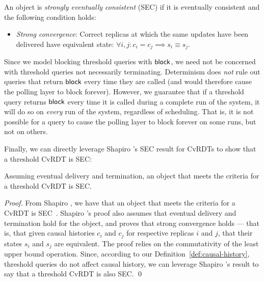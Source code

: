 \begin{definition}
  \label{def:strong-eventual-consistency}
  An object is \emph{strongly eventually consistent} (SEC) if it is
  eventually consistent and the following condition holds:
  \begin{itemize}
  \item \emph{Strong convergence}: Correct replicas at which the same
    updates have been delivered have equivalent state:
    $\forall i, j : c_i = c_j \implies s_i \equiv s_j$.
  \end{itemize}
\end{definition}
Since we model blocking threshold queries with $\textsf{block}$, we need not
be concerned with threshold queries not necessarily terminating.
Determinism does \emph{not} rule out queries that return $\textsf{block}$
every time they are called (and would therefore cause the polling
layer to block forever).  However, we guarantee that if a threshold
query returns $\textsf{block}$ every time it is called during a complete run
of the system, it will do so on \emph{every} run of the system,
regardless of scheduling.  That is, it is not possible for a query to
cause the polling layer to block forever on some runs, but not on
others.

Finally, we can directly leverage Shapiro 
\etal's SEC result for CvRDTs to show that a threshold CvRDT is SEC:
\begin{theorem}
  \label{thm:strong-eventual-consistency-of-threshold-cvrdts}
  Assuming eventual delivery and termination, an object that meets
  the criteria for a threshold CvRDT is SEC.
\end{theorem}
\begin{proof}
From Shapiro \etal, we have that an object that meets the criteria for
a CvRDT is SEC~\cite{crdts}.  Shapiro \etal's proof also assumes that
eventual delivery and termination hold for the object, and proves that
strong convergence holds --- that is, that given causal histories
$c_i$ and $c_j$ for respective replicas $i$ and $j$, that their states
$s_i$ and $s_j$ are equivalent.  The proof relies on the commutativity
of the least upper bound operation.  Since, according to our
Definition~\ref{def:causal-history}, threshold queries do not affect
causal history, we can leverage Shapiro \etal's result to say that a
threshold CvRDT is also SEC.
\qed
\end{proof}


